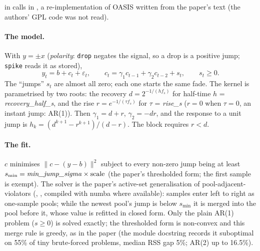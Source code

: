  in  calls  in
, a re-implementation of OASIS
\citep{friedrich2017fast} written from the paper's text (the authors' GPL code was not read).

\paragraph{The model.} With $y = \pm x$ (\emph{polarity}: \texttt{drop} negates the signal, so
a drop is a positive jump; \texttt{spike} reads it as stored),
\[
y_t = b + c_t + \varepsilon_t,\qquad
c_t = \gamma_1 c_{t-1} + \gamma_2 c_{t-2} + s_t,\qquad s_t \ge 0 .
\]
The ``jumps'' $s_t$ are almost all zero; each one starts the same fade. The kernel is
parametrised by two roots: the recovery $d = 2^{-1/(h f_s)}$ for half-time $h$ =
\emph{recovery\_half\_s}, and the rise $r = e^{-1/(\tau f_s)}$ for $\tau$ = \emph{rise\_s}
($r = 0$ when $\tau = 0$, an instant jump: AR(1)). Then $\gamma_1 = d + r$, $\gamma_2 = -dr$, and
the response to a unit jump is $h_k = (d^{k+1} - r^{k+1})/(d - r)$. The block requires $r < d$.

\paragraph{The fit.} $c$ minimises $\lVert c - (y - b)\rVert^2$ subject to every non-zero jump
being at least $s_{\min} = \text{\emph{min\_jump\_sigma}} \times \text{scale}$ (the paper's
thresholded form; the first sample is exempt). The solver is the paper's active-set
generalisation of pool-adjacent-violators (, , compiled with
numba where available): samples enter left to right as one-sample pools; while the newest
pool's jump is below $s_{\min}$ it is merged into the pool before it, whose value is refitted
in closed form. Only the plain AR(1) problem ($s \ge 0$) is solved exactly; the thresholded form
is non-convex and this merge rule is greedy, as in the paper (the module docstring records it
suboptimal on 55\% of tiny brute-forced problems, median RSS gap 5\%; AR(2) up to 16.5\%).

